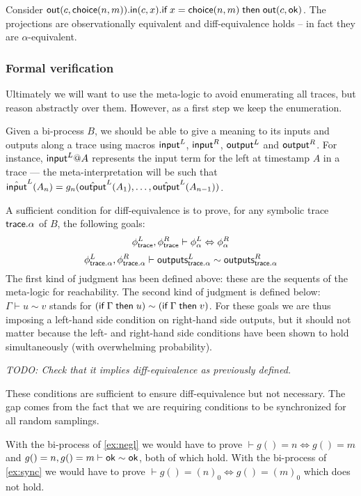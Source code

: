 \begin{example} \label{ex:problem}
  Consider $\mathsf{out}(c,\mathsf{choice}(n,m)).
  \mathsf{in}(c,x).
  \textsf{if}\; x=\mathsf{choice}(n,m) \;\textsf{then}\; \mathsf{out}(c,\mathsf{ok})$.
  The projections are observationally equivalent and diff-equivalence
  holds -- in fact they are $\alpha$-equivalent.
\end{example}

\subsubsection{Formal verification}

Ultimately we will want to use the meta-logic to avoid enumerating all
traces, but reason abstractly over them. However, as a first step we
keep the enumeration.

Given a bi-process $B$, we should be able to give a meaning to its inputs
and outputs along a trace using macros $\textsf{input}^L$, $\textsf{input}^R$, $\textsf{output}^L$
and $\textsf{output}^R$. For instance, $\textsf{input}^L@A$ represents the input term for
the left at timestamp $A$ in a trace --- the meta-interpretation will
be such that
$\hat{\textsf{input}}^L(A_n) = g_n(\hat{\textsf{output}}^L(A_1),\ldots,\hat{\textsf{output}}^L(A_{n-1}))$.

A sufficient condition for diff-equivalence is to prove,
for any symbolic trace $\textsf{trace}.\alpha$ of $B$, the following goals:
$$ \phi^L_{\textsf{trace}}, \phi^R_{\textsf{trace}} \vdash \phi^L_\alpha \Leftrightarrow \phi^R_\alpha $$
$$ \phi^L_{\textsf{trace}.\alpha}, \phi^R_{\textsf{trace}.\alpha} \vdash
   \textsf{outputs}_{\textsf{trace}.\alpha}^L \sim \textsf{outputs}_{\textsf{trace}.\alpha}^R $$
The first kind of judgment has been defined above: these are the sequents
of the meta-logic for reachability. The second kind of judgment is defined
below: $\Gamma \vdash u \sim v$ stands for $(\textsf{if}\; \Gamma \;\textsf{then}\; u) \sim
(\textsf{if}\; \Gamma \;\textsf{then}\; v)$. For these goals we are thus imposing a left-hand
side condition on right-hand side outputs, but it should not matter because
the left- and right-hand side conditions have been shown to hold
simultaneously (with overwhelming probability).

\emph{TODO: Check that it implies diff-equivalence as previously defined.}

These conditions are sufficient to ensure diff-equivalence but not necessary.
The gap comes from the fact that we are requiring conditions to be
synchronized for all random samplings.

\begin{example}
  With the bi-process of \cref{ex:negl} we would have to prove
  $\vdash g() = n \Leftrightarrow g() = m$ and
  $g()=n, g()=m \vdash \mathsf{ok} \sim \mathsf{ok}$, both of which hold.
  With the bi-process of \cref{ex:sync} we would have to prove
  $\vdash g() = (n)_0 \Leftrightarrow g() = (m)_0$ which does not hold.
\end{example}

